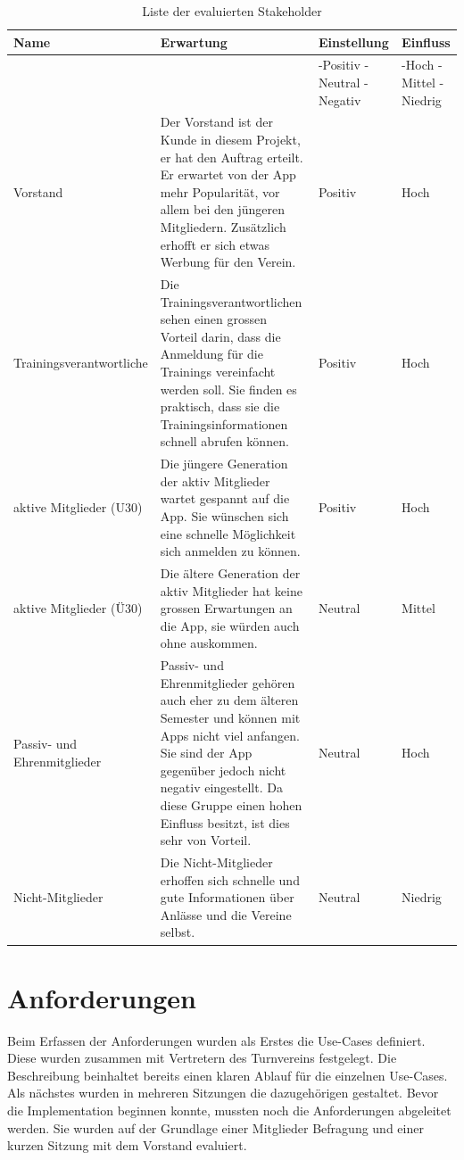 \begin{table}[ht]
\centering
  \begin{tabular}{ l | p{5cm} | p{1.5cm} | p{1.5cm} }
	\hline
	\rowcolor{darkgray}
	\textbf{Name}					&	\textbf{Erwartung}	&	\textbf{Einstellung} 	&	\textbf{Einfluss}	\\ \hline
	\rowcolor{gray}
								&				&	-Positiv \mbox{-Neutral} \mbox{-Negativ} 	&	-Hoch \mbox{-Mittel} \mbox{-Niedrig} \\ \hline
	Vorstand						&	Der Vorstand ist der Kunde in diesem Projekt, er hat den Auftrag erteilt. Er erwartet von der App mehr Popularität, vor allem bei den jüngeren Mitgliedern. Zusätzlich erhofft er sich etwas Werbung für den Verein.			
												& 	Positiv		&	Hoch		\\ \hline
	Trainingsverantwortliche				&	Die Trainingsverantwortlichen sehen einen grossen Vorteil darin, dass die Anmeldung für die Trainings vereinfacht werden soll. Sie finden es praktisch, dass sie die Trainingsinformationen schnell abrufen können.			
												& 	Positiv		&	Hoch		\\ \hline
	aktive Mitglieder (U30)				&	Die jüngere Generation der aktiv Mitglieder wartet gespannt auf die App.	Sie wünschen sich eine schnelle Möglichkeit sich anmelden zu können.		
												& 	Positiv		&	Hoch		\\ \hline
	aktive Mitglieder (Ü30)				&	Die ältere Generation der aktiv Mitglieder hat keine grossen Erwartungen an die App, sie würden auch ohne auskommen.		
												& 	Neutral	&	Mittel		\\ \hline
	Passiv- und Ehrenmitglieder			&	Passiv- und Ehrenmitglieder gehören auch eher zu dem älteren Semester und können mit Apps nicht viel anfangen. Sie sind der App gegenüber jedoch nicht negativ eingestellt. Da diese Gruppe einen hohen Einfluss besitzt, ist dies sehr von Vorteil.
												& 	Neutral	&	Hoch		\\ \hline
	Nicht-Mitglieder					&	Die Nicht-Mitglieder erhoffen sich schnelle und gute Informationen über Anlässe und die Vereine selbst.
												& 	Neutral	&	Niedrig	\\ \hline
  \end{tabular}
   \caption{Liste der evaluierten Stakeholder}\label{table:stakeholder}
\end{table}

\newpage
\section{Anforderungen}\label{sec.anfoderungen}
Beim Erfassen der Anforderungen wurden als Erstes die Use-Cases definiert. Diese wurden zusammen mit Vertretern des Turnvereins festgelegt. Die Beschreibung beinhaltet bereits einen klaren Ablauf für die einzelnen Use-Cases. Als nächstes wurden in mehreren Sitzungen die dazugehörigen  gestaltet. Bevor die Implementation beginnen konnte, mussten noch die Anforderungen abgeleitet werden. Sie wurden auf der Grundlage einer Mitglieder Befragung und einer kurzen Sitzung mit dem Vorstand evaluiert.

